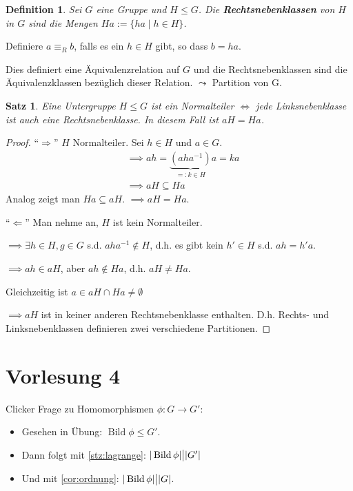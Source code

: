 \documentclass{article}
\theoremstyle{plain}
\newtheorem{definition}{Definition}
\newtheorem{theorem}{Satz}
\newcommand{\bild}{\mathop{\text{Bild}}}
\newcommand{\defn}[1]{\textbf{#1}}
\newcommand{\defeq}{:=}
\newcommand{\ug}{\leq}
\newcommand{\teilt}{\big{|}}
\begin{document}
\begin{definition}
    Sei $G$ eine Gruppe und $H\ug G$. Die \defn{Rechtsnebenklassen} von $H$ in $G$ sind die Mengen $Ha\defeq\{ha\mid h\in H\}$.
\end{definition}

Definiere $a\equiv_R b$, falls es ein $h\in H$ gibt, so dass $b=ha$.

Dies definiert eine Äquivalenzrelation auf $G$ und die Rechtsnebenklassen sind die Äquivalenzklassen bezüglich dieser Relation. $\leadsto$  Partition von G.

\begin{theorem}
    Eine Untergruppe $H\ug G$ ist ein Normalteiler $\Leftrightarrow$ jede Linksnebenklasse ist auch eine Rechtsnebenklasse. In diesem Fall ist $aH=Ha$.
\end{theorem}
\begin{proof}
    ``$\Rightarrow$'' $H$ Normalteiler. Sei $h\in H$ und $a\in G$.
    \begin{align*}
        &\implies ah=\underbrace{(aha^{-1})}_{=:k\in H}a = ka\\
        &\implies aH\subseteq Ha
    \end{align*}
    Analog zeigt man $Ha\subseteq aH$. $\implies aH=Ha$.

    ``$\Leftarrow$'' Man nehme an, $H$ ist kein Normalteiler. 
    
    $\implies \exists h\in H, g\in G$ s.d. $aha^{-1}\notin H$, d.h. es gibt kein $h'\in H$ s.d. $ah=h'a$.
    
    $\implies ah\in aH$, aber $ah\notin Ha$, d.h. $aH\neq Ha$.

    Gleichzeitig ist $a\in aH\cap Ha\neq \emptyset$

    $\implies aH$ ist in keiner anderen Rechtsnebenklasse enthalten. D.h. Rechts- und Linksnebenklassen definieren zwei verschiedene Partitionen.
\end{proof}

\section*{Vorlesung 4}
Clicker Frage zu Homomorphismen $\phi\colon G\to G'$:
\begin{itemize}
    \item Gesehen in Übung: $\bild \phi \ug G'$.
    \item Dann folgt mit \cref{stz:lagrange}: $|\bild \phi|\teilt |G'|$ 
    \item Und mit \cref{cor:ordnung}: $|\bild \phi| \teilt |G|$.
\end{itemize}
\end{document}
